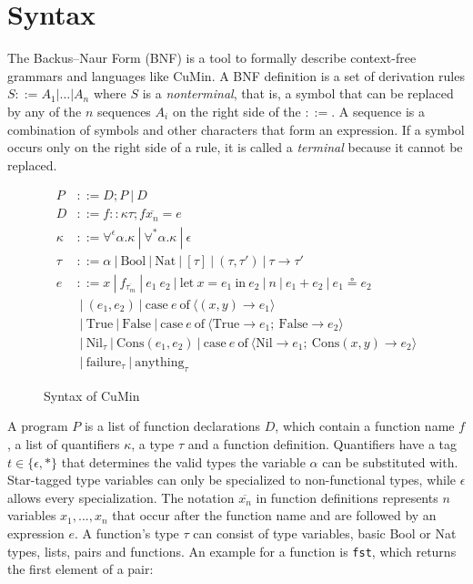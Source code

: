 \documentclass[fleqn, abstract=on]{scrreprt}
\begin{document}
\section{Syntax}
The Backus–Naur Form (BNF) is a tool to formally describe context-free grammars and languages like CuMin. A BNF definition is a set of derivation rules $S ::= A_{1} | \dots | A_{n} $ where $S$ is a \textit{nonterminal}, that is, a symbol that can be replaced by any of the $n$ sequences $A_{i}$ on the right side of the $::=$. A sequence is a combination of symbols and other characters that form an expression. If a symbol occurs only on the right side of a rule, it is called a \textit{terminal} because it cannot be replaced.
\begin{figure}[H]
	\begin{align*}
	P &::= D;P \:|\:D \\
	D &::= f :: \kappa \tau; f \overline{x_{n}} = e\\
	\kappa &::= \forall^{\epsilon} \alpha.\kappa \:|\: \forall^{*}\alpha.\kappa \:|\: \epsilon \\
	\tau &::= \alpha \:|\: \text{Bool} \:|\: \text{Nat} \:|\: [\tau] \:|\: (\tau,\tau ') \:|\: \tau \rightarrow \tau ' \\
	e &::= x \:|\: f_{\overline{\tau_{m}}} \:|\: e_{1}\: e_{2} \:|\: \text{let}\: x = e_{1} \:\text{in}\: e_{2} \:|\: n \:|\: e_{1} + e_{2} \:|\: e_{1} \circeq e_{2}\\
	&\:|\: (e_{1},e_{2}) \:|\: \text{case}\: e \:\text{of}\: \langle (x,y) \rightarrow e_{1}\rangle\\
	&\:|\: \text{True} \:|\: \text{False} \:|\: \text{case}\: e \:\text{of}\: \langle \text{True} \rightarrow e_{1};\:\text{False} \rightarrow e_{2}\rangle\\
	&\:|\: \text{Nil}_{\tau} \:|\: \text{Cons}(e_{1}, e_{2}) \:|\: \text{case}\: e \:\text{of}\: \langle \text{Nil} \rightarrow e_{1};\:\text{Cons}(x,y) \rightarrow e_{2}\rangle\\
	&\:|\: \text{failure}_{\tau} \:|\: \text{anything}_{\tau}
	\end{align*}
	\caption{Syntax of CuMin}
	\label{cumin:syntax}
\end{figure}\noindent
A program $P$ is a list of function declarations $D$, which contain a function name $f$, a list of quantifiers $\kappa$, a type $\tau$ and a function definition. Quantifiers have a tag $t \in \{\epsilon, *\}$ that determines the valid types the variable $\alpha$ can be substituted with. Star-tagged type variables can only be specialized to non-functional types, while $\epsilon$ allows every specialization. The notation $\overline{x_{n}}$ in function definitions represents $n$ variables $x_{1},...,x_{n}$ that occur after the function name and are followed by an expression $e$. A function's type $\tau$ can consist of type variables, basic Bool or Nat types, lists, pairs and functions. An example for a function is \texttt{fst}, which returns the first element of a pair:
\end{document}
